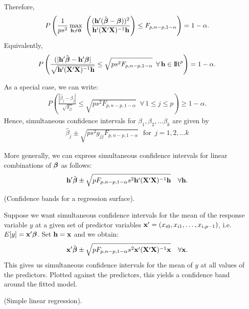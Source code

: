 Therefore, 
\begin{eqnarray*}
P \left( \frac{1}{ps^2}  \max_{\bfh\neq\zero}\ 
\left( {(\bfh'(\hat \bfbet - \bfbet))^2\over\bfh' (\bfX' \bfX)^{-1}\bfh} \right)  \le F_{p,n-p,1-\alpha} \right) = 1-\alpha.
\end{eqnarray*}
Equivalently,
\begin{eqnarray*}
P \left( \frac{( |\mathbf{h}'\hat {\mbox{\boldmath $\beta$}} -  \mathbf{h}' \mbox{\boldmath $\beta$}| }{\sqrt{\mathbf{h}' (\mathbf{X}' \mathbf{X})^{-1}\mathbf{h}}}  \le \sqrt{ps^2 F_{p,n-p,1-\alpha}}  \,\,\, \forall \, \mathbf{h} \in {\rm I\!R}^p \right) = 1-\alpha.
\end{eqnarray*}

As a special case, we can write:
\begin{eqnarray*}
P \left( \frac{|\hat \beta_j -  \beta_j|}{\sqrt{g_{jj}}}  \le \sqrt{ps^2 F_{p,n-p,1-\alpha}}  \,\,\, \forall \,1 \le j \le p \right) \ge 1-\alpha.
\end{eqnarray*}
Hence, simultaneous confidence intervals for  $\beta_1, \beta_2, \ldots \beta_k$ are given by 
\begin{eqnarray*}
{\hat \beta}_j  \pm \sqrt{ps^2 g_{jj} F_{p,n-p,1-\alpha}} \,\, \mbox{      for     } \, j=1,2,\ldots k 
\end{eqnarray*}



More generally, we can express simultaneous confidence intervals for linear combinations of $\mbox{\boldmath $\beta$}$ as follows:
$$
\mathbf{h}'\hat{\mbox{\boldmath $\beta$}} \pm \sqrt{pF_{p,n-p, 1-\alpha} s^2 \mathbf{h}'(\mathbf{X}'\mathbf{X})^{-1}\mathbf{h}}  \,\,\,\,\,\, \forall \mathbf{h}.
$$


\bexa
(Confidence bands for a regression surface).

Suppose we want simultaneous confidence intervals for the mean of the
response variable $y$ at a given set of predictor variables $\mathbf{x}' =
(x_{i0},x_{i1}, \ldots,x_{i,p-1})$, i.e.  $E[y] = \mathbf{x}'\mbox{\boldmath $\beta$}$.
Set $\mathbf{h} =\mathbf{x}$ and we obtain:
$$
\mathbf{x}'\hat{\mbox{\boldmath $\beta$}} \pm \sqrt{pF_{p,n-p, 1-\alpha} s^2 \mathbf{x}'(\mathbf{X}'\mathbf{X})^{-1}\mathbf{x}}  \,\,\,\,\,\, \forall \mathbf{x}.
$$
This gives us simultaneous confidence intervals for the mean of $y$ at
all values of the predictors.  Plotted against the predictors, this
yields a confidence band around the fitted model.
\eexa

\bexa
(Simple linear regression).

